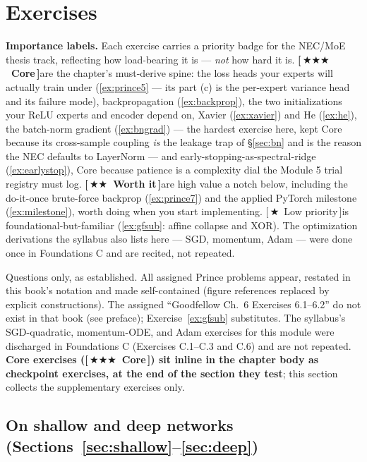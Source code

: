 \documentclass[11pt]{article}
\numberwithin{equation}{section}
\theoremstyle{plain}
\theoremstyle{definition}
\theoremstyle{remark}
\newcounter{exercise}
\newcommand{\prioCore}{{\normalfont\small\textbf{\textcolor{necblue}{[\,\ensuremath{\bigstar\bigstar\bigstar}\ Core\,]}}}\hspace{0.5em}}
\newcommand{\prioWorth}{{\normalfont\small\textbf{\textcolor{finmaroon}{[\,\ensuremath{\bigstar\bigstar}\ Worth it\,]}}}\hspace{0.5em}}
\newcommand{\prioLow}{{\normalfont\small\textcolor{priogray}{[\,\ensuremath{\bigstar}\ Low priority\,]}}\hspace{0.5em}}
\begin{document}
\section{Exercises}\label{sec:exercises}

\noindent\textbf{Importance labels.} Each exercise carries a priority badge for the NEC/MoE thesis track, reflecting how load-bearing it is --- \emph{not} how hard it is. \prioCore are the chapter's must-derive spine: the loss heads your experts will actually train under (\ref{ex:prince5} --- its part (c) is the per-expert variance head and its failure mode), backpropagation (\ref{ex:backprop}), the two initializations your ReLU experts and encoder depend on, Xavier (\ref{ex:xavier}) and He (\ref{ex:he}), the batch-norm gradient (\ref{ex:bngrad}) --- the hardest exercise here, kept Core because its cross-sample coupling \emph{is} the leakage trap of \S\ref{sec:bn} and is the reason the NEC defaults to LayerNorm --- and early-stopping-as-spectral-ridge (\ref{ex:earlystop}), Core because patience is a complexity dial the Module 5 trial registry must log. \prioWorth are high value a notch below, including the do-it-once brute-force backprop (\ref{ex:prince7}) and the applied PyTorch milestone (\ref{ex:milestone}), worth doing when you start implementing. \prioLow is foundational-but-familiar (\ref{ex:gfsub}: affine collapse and XOR). The optimization derivations the syllabus also lists here --- SGD, momentum, Adam --- were done once in Foundations C and are recited, not repeated.

Questions only, as established. All assigned Prince problems appear, restated in this book's notation and made self-contained (figure references replaced by explicit constructions). The assigned ``Goodfellow Ch.\ 6 Exercises 6.1--6.2'' do not exist in that book (see preface); Exercise~\ref{ex:gfsub} substitutes. The syllabus's SGD-quadratic, momentum-ODE, and Adam exercises for this module were discharged in Foundations C (Exercises C.1--C.3 and C.6) and are not repeated. \textbf{Core exercises (\prioCore) sit inline in the chapter body as checkpoint exercises, at the end of the section they test}; this section collects the supplementary exercises only.

\subsection*{On shallow and deep networks (Sections~\ref{sec:shallow}--\ref{sec:deep})}
\end{document}
